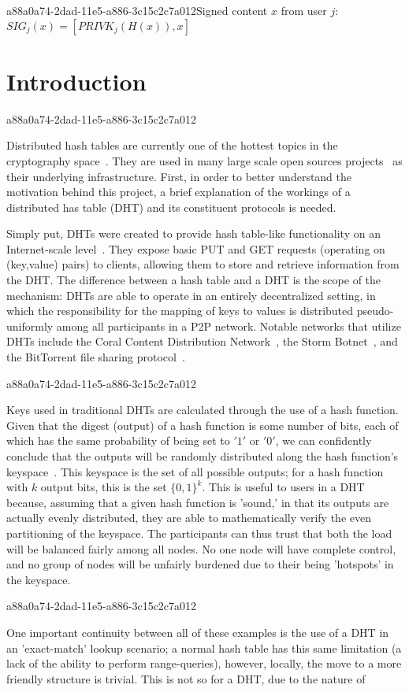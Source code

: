 \documentclass[12pt]{article}
\begin{document}
a88a0a74-2dad-11e5-a886-3c15c2c7a012Signed content $x$ from user $j$: $SIG_j(x) = \left[ PRIVK_j( H(x) ), x \right]$

\section{Introduction}
a88a0a74-2dad-11e5-a886-3c15c2c7a012\par Distributed hash tables are currently one of the hottest topics in the cryptography space~\cite{Stoica:2001dj,Rowstron:2001ea,Ratnasamy:2001wn}. They are used in many large scale open sources projects~\cite{Freitas:2013tb,Xu:2010vs,Perfitt:2010fh} as their underlying infrastructure. First, in order to better understand the motivation behind this project, a brief explanation of the workings of a distributed has table (DHT) and its constituent protocols is needed.

\par Simply put, DHTs were created to provide hash table-like functionality on an Internet-scale level~\cite{Ratnasamy:2001wn}. They expose basic PUT and GET requests (operating on (key,value) pairs) to clients, allowing them to store and retrieve information from the DHT. The difference between a hash table and a DHT is the scope of the mechanism: DHTs are able to operate in an entirely decentralized setting, in which the responsibility for the mapping of keys to values is distributed pseudo-uniformly among all participants in a P2P network. Notable networks that utilize DHTs include the Coral Content Distribution Network~\cite{Freedman:2004vb}, the Storm Botnet~\cite{Holz:2008uk}, and the BitTorrent file sharing protocol~\cite{Cohen:y1_8mBnw}.

a88a0a74-2dad-11e5-a886-3c15c2c7a012\par Keys used in traditional DHTs are calculated through the use of a hash function. Given that the digest (output) of a hash function is some number of bits, each of which has the same probability of being set to $'1'$ or $'0'$, we can confidently conclude that the outputs will be randomly distributed along the hash function's keyspace~. This keyspace is the set of all possible outputs; for a hash function with $k$ output bits, this is the set $\{0,1\}^k$. This is useful to users in a DHT because, assuming that a given hash function is 'sound,' in that its outputs are actually evenly distributed, they are able to mathematically verify the even partitioning of the keyspace. The participants can thus trust that both the load will be balanced fairly among all nodes. No one node will have complete control, and no group of nodes will be unfairly burdened due to their being 'hotspots' in the keyspace.~

a88a0a74-2dad-11e5-a886-3c15c2c7a012\par One important continuity between all of these examples is the use of a DHT in an 'exact-match' lookup scenario; a normal hash table has this same limitation (a lack of the ability to perform range-queries), however, locally, the move to a more friendly structure is trivial. This is not so for a DHT, due to the nature of
\printbibliography
\end{document}
